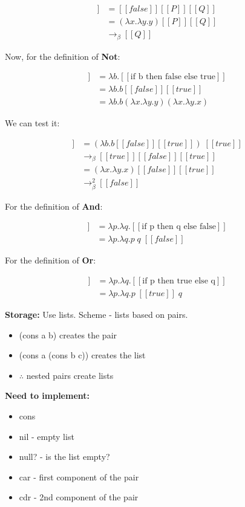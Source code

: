 \documentclass[11pt]{article}
\begin{document}
\begin{align*}
[[\text{if false then P else Q}]] &= [[false]][[P]][[Q]] \\
&= (\lambda x.\lambda y.y)[[P]][[Q]] \\
&\rightarrow_\beta [[Q]]
\end{align*}

Now, for the definition of {\bf Not}:

\begin{align*}
[[not]] &= \lambda b.[[\text{if b then false else true}]] \\
&= \lambda b.b[[false]][[true]] \\
&= \lambda b.b(\lambda x.\lambda y.y)(\lambda x.\lambda y.x)
\end{align*}

We can test it:

\begin{align*}
[[\text{not true}]] &= (\lambda b.b[[false]][[true]])\;[[true]] \\
&\rightarrow_\beta [[true]][[false]][[true]] \\
&= (\lambda x.\lambda y.x)[[false]][[true]] \\
&\rightarrow_\beta^2 [[false]]
\end{align*}

For the definition of {\bf And}: 

\begin{align*}
[[and]] &= \lambda p.\lambda q.[[\text{if p then q else false}]] \\
&= \lambda p.\lambda q.p\;q\;[[false]]
\end{align*}

For the definition of {\bf Or}: 

\begin{align*}
[[and]] &= \lambda p.\lambda q.[[\text{if p then true else q}]] \\
&= \lambda p.\lambda q.p\;[[true]]\;q
\end{align*}

\textbf{Storage:} Use lists. Scheme - lists based on pairs.
\begin{itemize}
	\item[] (cons a b) creates the pair
	\item[] (cons a (cons b c)) creates the list
	\item[] $\therefore$ nested pairs create lists
\end{itemize}

{\bf Need to implement:}
\begin{itemize}
	\item cons
	\item nil - empty list
	\item null? - is the list empty?
	\item car - first component of the pair
	\item cdr - 2nd component of the pair
\end{itemize}
\end{document}
